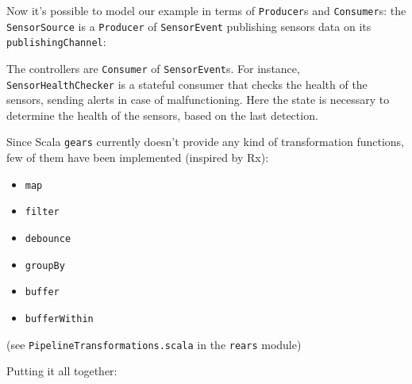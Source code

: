 \documentclass[aspectratio=1610,xcolor=dvipsnames,handout]{beamer}
\begin{document}
%
\begin{frame}
  
\end{frame}
%
\begin{frame}
  \small
  Now it's possible to model our example in terms of \texttt{Producer}s and \texttt{Consumer}s: the \texttt{SensorSource} is a \texttt{Producer} of \texttt{SensorEvent} publishing sensors data on its \texttt{publishingChannel}:
  
\end{frame}
%
\begin{frame}
  \small
  The controllers are \texttt{Consumer} of \texttt{SensorEvent}s. For instance, 
  \texttt{SensorHealthChecker} is a stateful consumer that checks the health of the sensors, sending alerts in case of malfunctioning. Here the state is necessary to determine the health of the sensors, based on the last detection.
  
\end{frame}
%
\begin{frame}
  
\end{frame}
%
\begin{frame}
  Since Scala \texttt{gears} currently doesn't provide any kind of transformation functions, few of them have been implemented (inspired by Rx):
  \begin{itemize}
      \item \texttt{map}
      \item \texttt{filter}
      \item \texttt{debounce}
      \item \texttt{groupBy}
      \item \texttt{buffer}
      \item \texttt{bufferWithin}
  \end{itemize}
  \footnotesize
  (see \texttt{PipelineTransformations.scala} in the \texttt{rears} module)
\end{frame}
%
\begin{frame}
  \small
  Putting it all together:
  
\end{frame}
%
\end{document}
